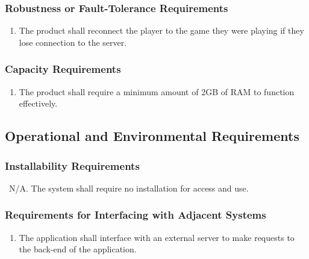 \documentclass[]{article}
\begin{document}
\subsubsection{Robustness or Fault-Tolerance Requirements}
\label{ssub:robustness_or_fault_tolerance_requirements}
\begin{enumerate}[{PR}1., leftmargin=2\parindent, resume]
	\item The product shall reconnect the player to the game they were playing if they lose connection to the server.
\end{enumerate}

\subsubsection{Capacity Requirements}
\label{ssub:capacity_requirements}
\begin{enumerate}[{PR}1., leftmargin=2\parindent, resume]
	\item The product shall require a minimum amount of 2GB of RAM to function effectively.
\end{enumerate}

\subsection{Operational and Environmental Requirements}
\label{sub:operational_and_environmental_requirements}

\subsubsection{Installability Requirements}
\label{ssub:installability_requirements}
\ N/A. The system shall require no installation for access and use.

\subsubsection{Requirements for Interfacing with Adjacent Systems}
\label{ssub:interfacing_adjacent_systems_requirements}
\begin{enumerate}[{OE}1., leftmargin=2\parindent]
    \item The application shall interface with an external server to make requests to the back-end of the application.
\end{enumerate}
\end{document}
